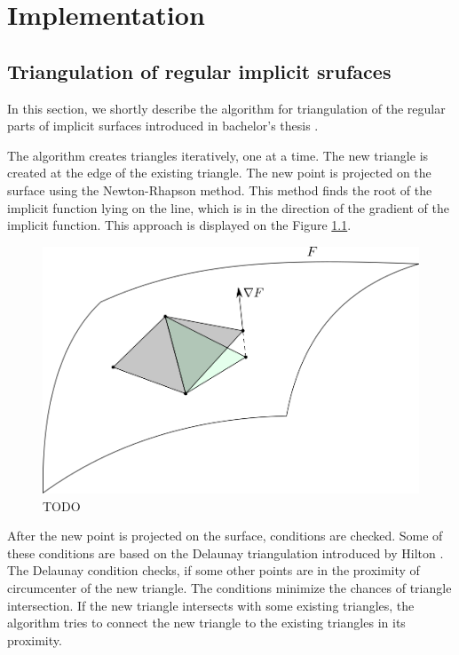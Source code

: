 \chapter{Implementation}
\label{chap3}

\section{Triangulation of regular implicit srufaces}
\label{triangulation-implicit}

In this section, we shortly describe the algorithm for triangulation of the regular
parts of implicit surfaces introduced in bachelor's thesis \cite{korecova2021triangulation}.

The algorithm creates triangles iteratively, one at a time. The new triangle is
created at the edge of the existing triangle. The new point is projected on the
surface using the Newton-Rhapson method. This method finds the root of the implicit
function lying on the line, which is in the direction of the gradient of the implicit
function. This approach is displayed on the Figure \ref{img:29}.
\begin{figure}
    \centerline{\includegraphics[scale=0.5]{images/img29}}
    \caption[TODO]
    {TODO}
    \label{img:29}
\end{figure}

After the new point is projected on the surface, conditions are checked. 
Some of these conditions are based on the Delaunay triangulation introduced
by Hilton \cite{hilton1996marching}. The Delaunay condition checks,
if some other points are in the proximity of circumcenter of the new triangle.
The conditions minimize the chances of triangle intersection.
If the new triangle intersects with some existing triangles, the algorithm
tries to connect the new triangle to the existing triangles in its proximity.

